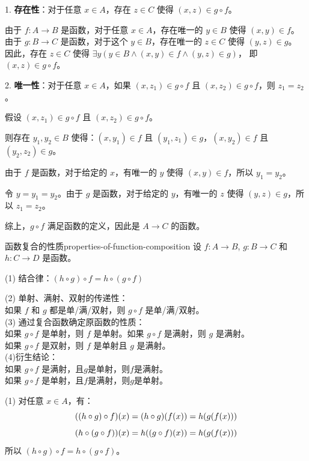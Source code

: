 1. \textbf{存在性}：对于任意 $x \in A$，存在 $z \in C$ 使得 $(x,z) \in g \circ f$。

由于 $f: A \to B$ 是函数，对于任意 $x \in A$，存在唯一的 $y \in B$ 使得 $(x,y) \in f$。
由于 $g: B \to C$ 是函数，对于这个 $y \in B$，存在唯一的 $z \in C$ 使得 $(y,z) \in g$。
因此，存在 $z \in C$ 使得 $\exists y (y \in B \land (x,y) \in f \land (y,z) \in g)$，
即 $(x,z) \in g \circ f$。

2. \textbf{唯一性}：对于任意 $x \in A$，如果 $(x,z_1) \in g \circ f$ 且 $(x,z_2) \in g \circ f$，则 $z_1 = z_2$。

假设 $(x,z_1) \in g \circ f$ 且 $(x,z_2) \in g \circ f$。

则存在 $y_1, y_2 \in B$ 使得：$(x,y_1) \in f$ 且 $(y_1,z_1) \in g$，$(x,y_2) \in f$ 且 $(y_2,z_2) \in g$。

由于 $f$ 是函数，对于给定的 $x$，有唯一的 $y$ 使得 $(x,y) \in f$，所以 $y_1 = y_2$。

令 $y = y_1 = y_2$。由于 $g$ 是函数，对于给定的 $y$，有唯一的 $z$ 使得 $(y,z) \in g$，所以 $z_1 = z_2$。

综上，$g \circ f$ 满足函数的定义，因此是 $A \to C$ 的函数。
\begin{theorem}{函数复合的性质}{properties-of-function-composition}
设 $f: A \to B$, $g: B \to C$ 和 $h: C \to D$ 是函数。

(1) 结合律：$(h \circ g) \circ f = h \circ (g \circ f)$

(2) 单射、满射、双射的传递性：\\
如果 $f$ 和 $g$ 都是单/满/双射，则 $g \circ f$ 是单/满/双射。\\
(3) 通过复合函数确定原函数的性质：\\
如果 $g \circ f$ 是单射，则 $f$ 是单射。如果 $g \circ f$ 是满射，则 $g$ 是满射。\\
如果 $g \circ f$ 是双射，则 $f$ 是单射且 $g$ 是满射。\\
(4)衍生结论：\\
如果 $g \circ f$ 是满射，且$g$是单射，则$f$是满射。 \\
如果 $g \circ f$ 是单射，且$f$是满射，则$g$是单射。
\end{theorem}
(1) 对任意 $x \in A$，有：\vspace{-10pt}
\[
((h \circ g) \circ f)(x) = (h \circ g)(f(x)) = h(g(f(x)))\vspace{-10pt}
\]
\[
(h \circ (g \circ f))(x) = h((g \circ f)(x)) = h(g(f(x)))\vspace{-10pt}
\]
所以 $(h \circ g) \circ f = h \circ (g \circ f)$。

